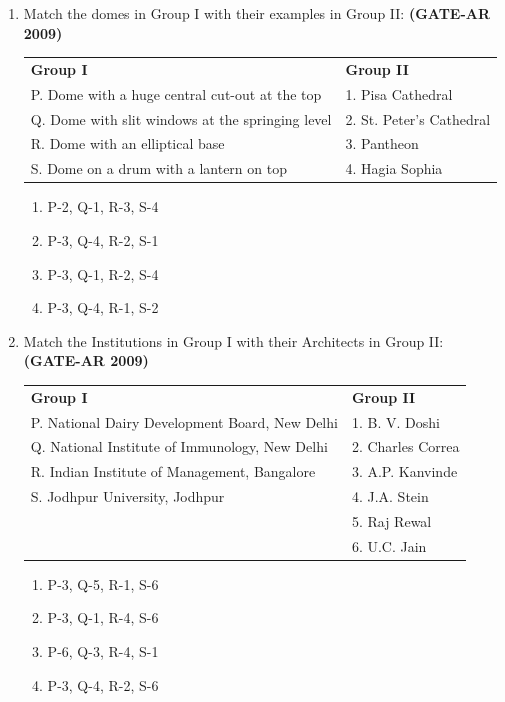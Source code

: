 \documentclass[a4paper,10pt]{article}
\begin{document}
\begin{enumerate}
    \item Match the domes in Group I with their examples in Group II: \hfill \textbf{(GATE-AR 2009)} \\
    \begin{tabular}{ l l }
	\textbf{Group I} & \textbf{Group II} \\
	P. Dome with a huge central cut-out at the top & 1. Pisa Cathedral \\
	Q. Dome with slit windows at the springing level & 2. St. Peter’s Cathedral \\
	R. Dome with an elliptical base & 3. Pantheon \\
	S. Dome on a drum with a lantern on top & 4. Hagia Sophia \\
	\end{tabular}
	\begin{multicols}{2}
	\begin{enumerate}
        \item P-2, Q-1, R-3, S-4
        \item P-3, Q-4, R-2, S-1
        \item P-3, Q-1, R-2, S-4
        \item P-3, Q-4, R-1, S-2
    \end{enumerate}
	\end{multicols}

    \item Match the Institutions in Group I with their Architects in Group II: \hfill \textbf{(GATE-AR 2009)} \\
    \begin{tabular}{ l l }
	\textbf{Group I} & \textbf{Group II} \\
	P. National Dairy Development Board, New Delhi & 1. B. V. Doshi \\
	Q. National Institute of Immunology, New Delhi & 2. Charles Correa \\
	R. Indian Institute of Management, Bangalore & 3. A.P. Kanvinde \\
	S. Jodhpur University, Jodhpur & 4. J.A. Stein \\
	& 5. Raj Rewal \\
	& 6. U.C. Jain \\
	\end{tabular}
	\begin{multicols}{2}
	\begin{enumerate}
        \item P-3, Q-5, R-1, S-6
        \item P-3, Q-1, R-4, S-6
        \item P-6, Q-3, R-4, S-1
        \item P-3, Q-4, R-2, S-6
    \end{enumerate}
	\end{multicols}


\end{enumerate}
\end{document}
